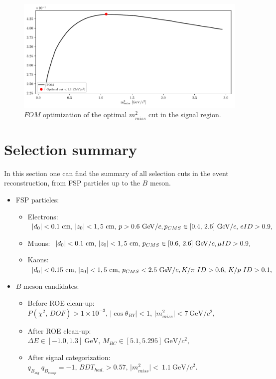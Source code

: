 \documentclass[  headings=standardclasses,
  headings=big,oneside,a4paper,openany,12pt]{scrbook}
\newcommand {\e}[1]{\mathrm{~#1}}
\newcommand {\E}[1]{\times 10^{#1}}
\begin{document}
\begin{figure}[H]
\centering
\captionsetup{width=0.8\linewidth}
\includegraphics[width=\linewidth]{fig/missm2_opt}
\caption{$FOM$ optimization of the optimal $m_{miss}^2$ cut in the signal region.}
\label{fig:missm2opt}
\end{figure}

\section{Selection summary}
\label{s:ss}
In this section one can find the summary of all selection cuts in the event reconstruction, from FSP particles up to the $B$ meson.

\begin{itemize}
\item FSP particles:
	\begin{itemize}
	\item Electrons: $\vert d_0 \vert < 0.1\e{cm},\,\vert z_0 \vert < 1,5\e{cm},\,p>0.6\e{GeV}/c,\\p_{CMS}\in[0.4,\,2.6]\e{GeV}/c,\,eID>0.9,$
    \item Muons: $\vert d_0 \vert < 0.1\e{cm},\,\vert z_0 \vert < 1,5\e{cm},\,p_{CMS}\in[0.6,\,2.6]\e{GeV}/c,\\\mu ID>0.9,$
    \item Kaons: $\vert d_0 \vert < 0.15\e{cm},\,\vert z_0 \vert < 1,5\e{cm},\,p_{CMS} < 2.5\e{GeV}/c,\\K/\pi~ID>0.6,\,K/p~ID>0.1,$
	\end{itemize}
\item $B$ meson candidates:
	\begin{itemize}
	\item Before ROE clean-up: $P(\chi^2,\,DOF) > 1\E{-3},\,\vert \cos \theta_{BY} \vert < 1,\,\vert m_{miss}^2 \vert < 7\e{GeV}/c^2,$
    \item After ROE clean-up: $\Delta E \in [-1.0,1.3]\e{GeV},\,M_{BC} \in [5.1,5.295]\e{GeV}/c^2,$
    \item After signal categorization: $q_{B_{sig}}~q_{B_{comp}} = -1,\,BDT_{had.} > 0.57,\,\vert m_{miss}^2\vert<~1.1\e{GeV}/c^2.$
	\end{itemize}
\end{itemize}
\end{document}
